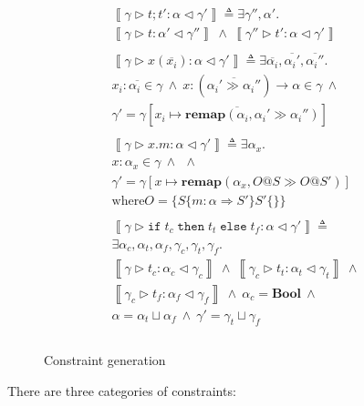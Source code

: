 \documentclass[preprint]{sigplanconf}
\newcommand{\remapapp}[3]{\ensuremath{\mathbf{remap}(#1, #2 \gg #3)}}
\newcommand{\inferrule}[4]{\left\llbracket #1 \triangleright #2 : #3 \triangleleft #4 \right\rrbracket}
\newcommand{\inferlhs}[1]{\left\llbracket \gamma \triangleright #1 : \alpha \triangleleft \gamma' \right\rrbracket}
\newcommand{\boolt}{\mathbf{Bool}}
\newcommand{\ift}[3]{\mathtt{if} \; #1 \; \mathtt{then} \; #2 \; \mathtt{else} \; #3}
\newcommand{\cand}{\:\wedge\:}
\begin{document}
\begin{figure}
\[\begin{array}{l}
\inferlhs{t ; t'} \triangleq
\exists \gamma'', \alpha' . \\
\inferrule{\gamma}{t}{\alpha'}{\gamma''}
\cand
\inferrule{\gamma''}{t'}{\alpha}{\gamma'}
\\\\

\inferlhs{x ( \overline{x_i} )} \triangleq
\exists \overline{\alpha_i}, \overline{\alpha_i'}, \overline{\alpha_i''} . \\
\overline{x_i : \alpha_i \in \gamma}
\cand 
x : ( \overline{\alpha_i' \gg \alpha_i''} ) \rightarrow \alpha \in \gamma
\cand
\\
\gamma' = \gamma [ \overline{x_i \mapsto \remapapp{\alpha_i}{\alpha_i'}{\alpha_i''} } ]
\\\\

\inferlhs{x.m} \triangleq
\exists \alpha_x . \\
x : \alpha_x \in \gamma
\cand 
\cand  \\
\gamma' = \gamma[ x \mapsto \remapapp{\alpha_x}{O@S}{O@S'} ]
\\
\mathrm{where } O = \{ S \{ m : \alpha \Rightarrow S' \} S' \{ \} \}
\\\\

\inferlhs{\ift{t_c}{t_t}{t_f}} \triangleq
\\
\exists \alpha_c, \alpha_t, \alpha_f, \gamma_c, \gamma_t, \gamma_f . \\
\inferrule{\gamma}{t_c}{\alpha_c}{\gamma_c}
\cand
\inferrule{\gamma_c}{t_t}{\alpha_t}{\gamma_t}
\cand 
\\
\inferrule{\gamma_c}{t_f}{\alpha_f}{\gamma_f}
\cand
\alpha_c = \boolt
\cand
\\
\alpha = \alpha_t \sqcup \alpha_f
\cand
\gamma' = \gamma_t \sqcup \gamma_f
\\\\

\end{array}
\]
\caption{\label{fig:constraintgen} Constraint generation}
\end{figure}

There are three categories of constraints:
\end{document}
